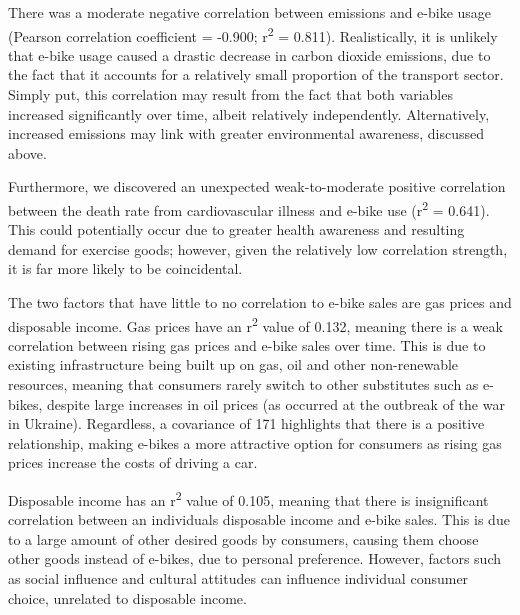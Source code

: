 There was a moderate negative correlation between emissions and e-bike usage (Pearson correlation coefficient = -0.900; r\textsuperscript{2} = 0.811). Realistically, it is unlikely that e-bike usage caused a drastic decrease in carbon dioxide emissions, due to the fact that it accounts for a relatively small proportion of the transport sector. Simply put, this correlation may result from the fact that both variables increased significantly over time, albeit relatively independently. Alternatively, increased emissions may link with greater environmental awareness, discussed above.

Furthermore, we discovered an unexpected weak-to-moderate positive correlation between the death rate from cardiovascular illness and e-bike use (r\textsuperscript{2} = 0.641). This could potentially occur due to greater health awareness and resulting demand for exercise goods; however, given the relatively low correlation strength, it is far more likely to be coincidental.

The two factors that have little to no correlation to e-bike sales are gas prices and disposable income. Gas prices have an r\textsuperscript{2} value of 0.132, meaning there is a weak correlation between rising gas prices and e-bike sales over time. This is due to existing infrastructure being built up on gas, oil and other non-renewable resources, meaning that consumers rarely switch to other substitutes such as e-bikes, despite large increases in oil prices (as occurred at the outbreak of the war in Ukraine). Regardless, a covariance of 171 highlights that there is a positive relationship, making e-bikes a more attractive option for consumers as rising gas prices increase the costs of driving a car.

Disposable income has an r\textsuperscript{2} value of 0.105, meaning that there is insignificant correlation between an individual\textquotesingle s disposable income and e-bike sales. This is due to a large amount of other desired goods by consumers, causing them choose other goods instead of e-bikes, due to personal preference. However, factors such as social influence and cultural attitudes can influence individual consumer choice, unrelated to disposable income.

